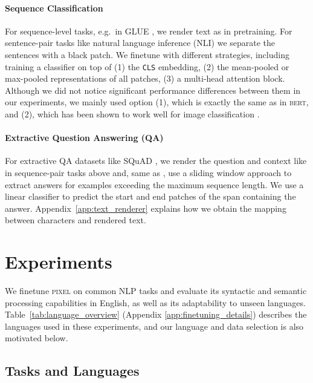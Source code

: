 \documentclass{article}
\newcommand{\model}{\textsc{pixel}\xspace}
\begin{document}
\vspace{-2mm}
\paragraph{Sequence Classification} For sequence-level tasks, e.g.\ in GLUE \citep{wang-etal-2018-glue}, we render text as in pretraining. For sentence-pair tasks like natural language inference (NLI) we separate the sentences with a black patch. We finetune with different strategies, including training a classifier on top of
(1) the {\footnotesize\texttt{CLS}} embedding, (2) the mean-pooled or max-pooled representations of all patches, (3) a multi-head attention block. Although we did not notice significant performance differences between them in our experiments, we mainly used option (1), which is exactly the same as in \textsc{bert}, and (2), which has been shown to work well for image classification \citep{https://doi.org/10.48550/arxiv.2205.14540}.

\vspace{-2mm}
\paragraph{Extractive Question Answering (QA)} For extractive QA datasets like SQuAD \citep{rajpurkar-etal-2016-squad}, we render the question and context like in sequence-pair tasks above and, same as \cite{devlin-etal-2019-bert}, use a sliding window approach to extract answers for examples exceeding the maximum sequence length. We use a linear classifier to predict the start and end patches of the span containing the answer. Appendix~\ref{app:text_renderer} explains how we obtain the mapping between characters and rendered text.

\vspace{-2mm}
\section{Experiments}
\vspace{-2mm}

We finetune \model on common NLP tasks and evaluate its syntactic and semantic processing capabilities in English, as well as its adaptability to unseen languages. Table~\ref{tab:language_overview} (Appendix \ref{app:finetuning_details}) describes the languages used in these experiments, and our language and data selection is also motivated below.

\vspace{-2mm}
\subsection{Tasks and Languages}
\label{sec:tasks_languages}
\vspace{-2mm}
\end{document}
